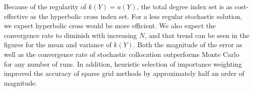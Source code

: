 \documentclass{anstrans} \usepackage{amsmath} \usepackage{amssymb}
\begin{document}
Because of the regularity of $k(Y)=u(Y)$, the total degree index set is as cost-effective as the hyperbolic
cross index set.  For a less regular stochastic solution, we expect hyperbolic cross would be more efficient.
We also expect the convergence rate to diminish with increasing $N$, and that trend can be seen in the figures
for the mean and variance of $k(Y)$. Both the magnitude of the error as well as the convergence rate of
stochastic collocation outperforms Monte Carlo for any number of runs.  In addition, heuristic selection of
importance weighting improved the accuracy of sparse grid methods by approximately half an order of magnitude.
%
%
  
\end{document}
